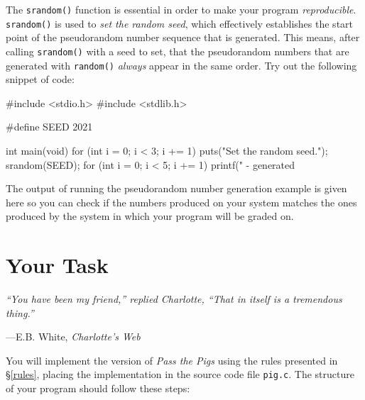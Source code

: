 \documentclass{article}
\begin{document}
The \texttt{srandom()} function is essential in order to make your
program \emph{reproducible}. \texttt{srandom()} is used to \emph{set the
random seed}, which effectively establishes the start point of the
pseudorandom number sequence that is generated. This means, after
calling \texttt{srandom()} with a seed to set, that the pseudorandom
numbers that are generated with \texttt{random()} \emph{always} appear
in the same order. Try out the following snippet of code:

\begin{clisting}{}
#include <stdio.h>
#include <stdlib.h>

#define SEED 2021

int main(void) {
    for (int i = 0; i < 3; i += 1) {
        puts("Set the random seed.");
        srandom(SEED);
        for (int i = 0; i < 5; i += 1) {
            printf(" - generated %
        }
    }
}
\end{clisting}

The output of running the pseudorandom number generation example is
given here so you can check if the numbers produced on your system
matches the ones produced by the system in which your program will be
graded on.


\section{Your Task}

\textwidth \epigraph{\emph{``You have been my
friend,'' replied Charlotte, ``That in itself is a tremendous
thing.''}}{---E.B. White, \emph{Charlotte's Web}}

\noindent You will implement the version of \emph{Pass the Pigs} using
the rules presented in \S\ref{rules}, placing the implementation in the
source code file \texttt{pig.c}. The structure of your program should
follow these steps:
\end{document}
